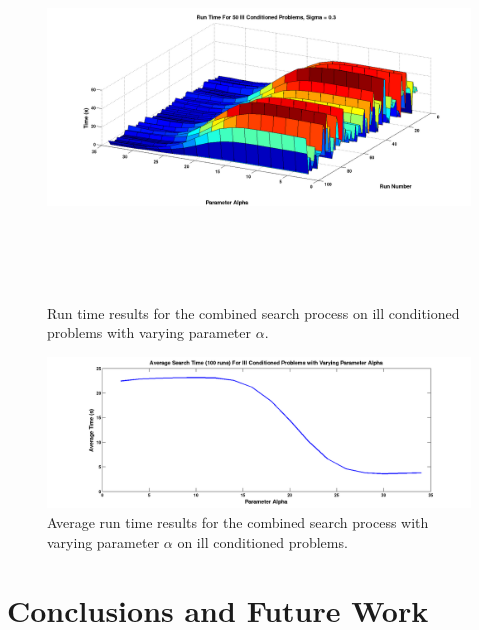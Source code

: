 \documentclass[12pt,Bold,letterpaper]{mcgilletdclass}
\begin{document}
\begin{figure}
\centering
\includegraphics[width=6in,height=4in]{illConditionedSearch.png}
\caption{Run time results for the combined search process on ill conditioned problems with varying parameter $\alpha$.}
\label{fig:illConditionedSearch}
\end{figure}

\begin{figure}
\centering
\includegraphics[scale=0.36]{averageSearchTimesIll.png}
\caption{Average run time results for the combined search process with varying parameter $\alpha$ on ill conditioned problems.}
\label{fig:searchAverageIll}
\end{figure}

\chapter{Conclusions and Future Work} \label{chap:Conclusion}
\end{document}
